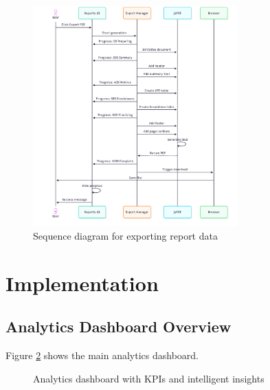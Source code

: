 \begin{figure}[H]
\centering
\includegraphics[width=0.7\textwidth]{img/chap_07/sprint5_sequence_export.png}
\caption{Sequence diagram for exporting report data}
\label{fig:sprint5-seq2}
\end{figure}

\section{Implementation}

\subsection{Analytics Dashboard Overview}

Figure \ref{fig:sprint5-impl1} shows the main analytics dashboard.

\begin{figure}[H]
\centering
{}
\caption{Analytics dashboard with KPIs and intelligent insights}
\label{fig:sprint5-impl1}
\end{figure}

